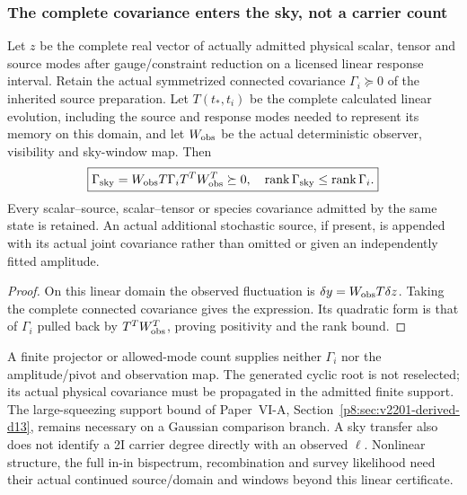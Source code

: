 \documentclass[12pt,a4paper]{article}
\begin{document}
\subsubsection{The complete covariance enters the sky, not a carrier count}
\begin{corollary}
\label{p6b:cor:v2210-lit-sky-covariance}
Let $z$ be the complete real vector of actually admitted physical scalar,
tensor and source modes after gauge/constraint reduction on a licensed
linear response interval. Retain the actual symmetrized connected
covariance $\Gamma_i\succeq0$ of the inherited source preparation.
Let $T(t_*,t_i)$ be the complete calculated linear evolution, including
the source and response modes needed to represent its memory on this
domain, and let $W_{\rm obs}$ be the actual deterministic observer,
visibility and sky-window map. Then
\begin{equation}
\label{p6b:eq:v2210-lit-sky-covariance}
 \boxed{\Gamma_{\rm sky}=W_{\rm obs}T\Gamma_iT^T
                                      W_{\rm obs}^T\succeq0,
 \quad\operatorname{rank}\Gamma_{\rm sky}
                       \le\operatorname{rank}\Gamma_i.}
\end{equation}
Every scalar--source, scalar--tensor or species covariance admitted by the
same state is retained. An actual additional stochastic source, if present,
is appended with its actual joint covariance rather than omitted or given
an independently fitted amplitude.
\end{corollary}
\begin{proof}
On this linear domain the observed fluctuation is
$\delta y=W_{\rm obs}T\delta z$. Taking the complete connected covariance
gives the expression. Its quadratic form is that of $\Gamma_i$ pulled
back by $T^TW_{\rm obs}^T$, proving positivity and the rank bound.
\end{proof}
A finite projector or allowed-mode count supplies neither $\Gamma_i$ nor
the amplitude/pivot and observation map. The generated cyclic root is
not reselected; its actual physical covariance must be propagated in the
admitted finite support. The large-squeezing support bound of Paper~VI-A,
Section~\ref{p8:sec:v2201-derived-d13}, remains necessary on a Gaussian
comparison branch. A sky transfer also does not identify a 2I carrier
degree directly with an observed $\ell$. Nonlinear structure, the full
in-in bispectrum, recombination and survey likelihood need their actual
continued source/domain and windows beyond this linear certificate.
\end{document}
